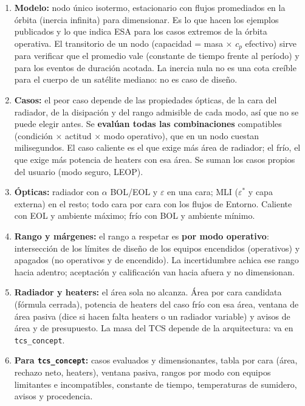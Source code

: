 \documentclass[11pt,a4paper]{article}
\newcommand{\code}[1]{\texttt{#1}}
\begin{document}
\begin{enumerate}
  \item \textbf{Modelo:} nodo único isotermo, estacionario con flujos promediados en la órbita (inercia infinita) para dimensionar. Es lo que hacen los ejemplos publicados y lo que indica ESA para los casos extremos de la órbita operativa. El transitorio de un nodo (capacidad = masa $\times$ $c_p$ efectivo) sirve para verificar que el promedio vale (constante de tiempo frente al período) y para los eventos de duración acotada. La inercia nula no es una cota creíble para el cuerpo de un satélite mediano: no es caso de diseño.
  \item \textbf{Casos:} el peor caso depende de las propiedades ópticas, de la cara del radiador, de la disipación y del rango admisible de cada modo, así que no se puede elegir antes. Se \textbf{evalúan todas las combinaciones} compatibles (condición $\times$ actitud $\times$ modo operativo), que en un nodo cuestan milisegundos. El caso caliente es el que exige más área de radiador; el frío, el que exige más potencia de heaters con esa área. Se suman los casos propios del usuario (modo seguro, LEOP).
  \item \textbf{Ópticas:} radiador con $\alpha$ BOL/EOL y $\varepsilon$ en una cara; MLI ($\varepsilon^*$ y capa externa) en el resto; todo cara por cara con los flujos de Entorno. Caliente con EOL y ambiente máximo; frío con BOL y ambiente mínimo.
  \item \textbf{Rango y márgenes:} el rango a respetar es \textbf{por modo operativo}: intersección de los límites de diseño de los equipos encendidos (operativos) y apagados (no operativos y de encendido). La incertidumbre achica ese rango hacia adentro; aceptación y calificación van hacia afuera y no dimensionan.
  \item \textbf{Radiador y heaters:} el área sola no alcanza. Área por cara candidata (fórmula cerrada), potencia de heaters del caso frío con esa área, ventana de área pasiva (dice si hacen falta heaters o un radiador variable) y avisos de área y de presupuesto. La masa del TCS depende de la arquitectura: va en \code{tcs\_concept}.
  \item \textbf{Para \code{tcs\_concept}:} casos evaluados y dimensionantes, tabla por cara (área, rechazo neto, heaters), ventana pasiva, rangos por modo con equipos limitantes e incompatibles, constante de tiempo, temperaturas de sumidero, avisos y procedencia.
\end{enumerate}

\end{document}
